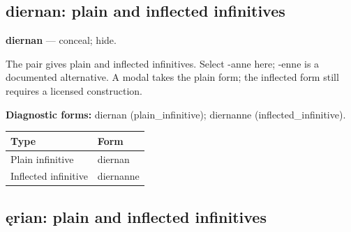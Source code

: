 \subsection*{diernan: plain and inflected infinitives}

\par\begin{minipage}{\linewidth}\raggedright
\textbf{diernan} — conceal; hide.

The pair gives plain and inflected infinitives. Select -anne here; -enne is a documented alternative. A modal takes the plain form; the inflected form still requires a licensed construction.

\textbf{Diagnostic forms:} diernan (plain\_infinitive); diernanne (inflected\_infinitive).

\par\begingroup
\fontsize{10.5}{13.2}\selectfont
\setlength{\LTleft}{0pt}\setlength{\LTright}{\fill}
\noindent
\begin{tabular}{@{}>{\raggedright\arraybackslash}p{71.72mm}>{\raggedright\arraybackslash}p{49.46mm}@{}}
\toprule
\textbf{Type} & \textbf{Form} \\
\midrule
Plain infinitive & diernan \\
Inflected infinitive & diernanne \\
\bottomrule
\end{tabular}
\par\endgroup

\end{minipage}\par
{}
\subsection*{ęrian: plain and inflected infinitives}

